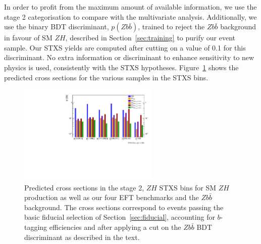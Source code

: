 %
In order to profit from the maximum amount of available information, we use the stage 2 categorisation to compare with the multivariate analysis. Additionally, we use the binary BDT discriminant, $p(Z b\bar{b})$, trained to reject the $Zb\bar{b}$ background in favour of SM $ZH$, described in Section~\ref{sec:training} to purify our event sample. Our STXS yields are computed after cutting on a value of 0.1 for this discriminant. No extra information or discriminant to enhance sensitivity to new physics is used, consistently with the STXS hypotheses.  Figure~\ref{fig:stxs_crosssec} shows the predicted cross sections for the various samples in the STXS bins.

\begin{figure}[h!]
\centering
\includegraphics[width=0.6\textwidth]{plots/STXS_comp.pdf}
\caption{
\label{fig:stxs_crosssec}
Predicted cross sections in the stage 2, $ZH$ STXS bins for SM $ZH$ production as well as our four EFT benchmarks and the $Zb\bar{b}$ background. The cross sections correspond to events passing the basic fiducial selection of Section~\ref{sec:fiducial}, accounting for $b$-tagging efficiencies and after applying a cut on the $Zb\bar{b}$ BDT discriminant as described in the text.
    }
\end{figure}






